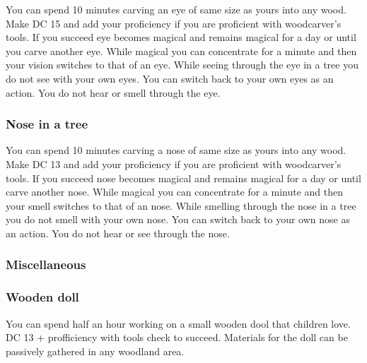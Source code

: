 You can spend 10 minutes carving an eye of same size as yours into any wood. Make DC 15 \arcana and add your proficiency if you are proficient with woodcarver's tools. If you succeed eye becomes magical and remains magical for a day or until you carve another eye. While magical you can concentrate for a minute and then your vision switches to that of an eye. While seeing through the eye in a tree you do not see with your own eyes. You can switch back to your own eyes as an action. You do not hear or smell through the eye.

\subsubsection{Nose in a tree}

You can spend 10 minutes carving a nose of same size as yours into any wood. Make DC 13 \arcana and add your proficiency if you are proficient with woodcarver's tools. If you succeed nose becomes magical and remains magical for a day or until carve another nose. While magical you can concentrate for a minute and then your smell switches to that of an nose. While smelling through the nose in a tree you do not smell with your own nose. You can switch back to your own nose as an action. You do not hear or see through the nose.

\subsubsection{Miscellaneous}

\subsubsection{Wooden doll}

You can spend half an hour working on a small wooden dool that children love. DC 13 \sleightofhand + profficiency with tools check to succeed. Materials for the doll can be passively gathered in any woodland area.
